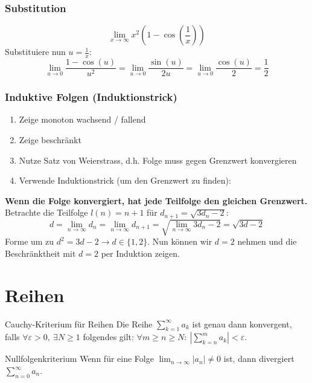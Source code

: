 \documentclass[a4paper,fontsize = 7pt]{scrartcl}
\def\limn{\lim_{n\to \infty}}
\def\sumk{\sum_{k=1}^\infty}
\def\sumn{\sum_{n=0}^\infty}
\begin{document}
\subsubsection{Substitution}
$$\lim_{x\to\infty} x^2 \left(1-\cos\left(\frac{1}{x}\right)\right)$$
Substituiere nun $u = \frac{1}{x}$:
$$\lim_{u \to 0} \frac{1 - \cos(u)}{u^2} = \lim_{u \to 0} \frac{\sin(u)}{2u} = \lim_{u\to 0} \frac{\cos(u)}{2} = \frac{1}{2}$$

\subsubsection{Induktive Folgen (Induktionstrick)}
\begin{enumerate}
  \item Zeige monoton wachsend / fallend
  \item Zeige beschränkt
  \item Nutze Satz von Weierstrass, d.h. Folge muss gegen Grenzwert konvergieren
  \item Verwende Induktionstrick (um den Grenzwert zu finden):
\end{enumerate}
\textbf{Wenn die Folge konvergiert, hat jede Teilfolge den gleichen Grenzwert.} Betrachte die Teilfolge $l(n) = n + 1$ für $d_{n+1} = \sqrt{3d_n - 2}$:
$$d = \lim_{n\to\infty} d_n = \lim_{n\to\infty} d_{n+1} = \sqrt{\lim_{n \to \infty} 3d_n -2} = \sqrt{3d -2}$$
Forme um zu $ d^2 = 3d -2 \to d \in \{1,2\}$. Nun können wir $d = 2$ nehmen und die Beschränktheit mit $d=2$ per Induktion zeigen.

\section{Reihen}

\begin{mainbox}{Cauchy-Kriterium für Reihen}
  \vspace{-4pt}
Die Reihe $\sumk a_k$ ist genau dann konvergent, falls $\forall \varepsilon > 0, \ \exists N \ge 1$ folgendes gilt: $\forall m \ge n \ge N: \ | \sum_{k=n}^m a_k | < \varepsilon$.
  \vspace{-4pt}
\end{mainbox}

\begin{subbox}{Nullfolgenkriterium}
  \vspace{-4pt}
 Wenn für eine Folge $\limn |a_n| \ne 0$ ist, dann divergiert $\sumn a_n$.
 \vspace{-4pt}
\end{subbox}
\end{document}
